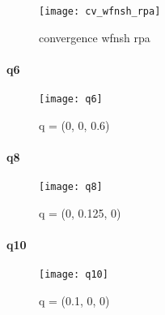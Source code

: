 \begin{figure}[!h]\label{CVwfnshRPA}
    \centering
    \texttt{[image: cv\_wfnsh\_rpa]}
    \caption{convergence wfnsh rpa}
\end{figure}

\paragraph{q6}
\begin{figure}[!h]
    \centering
    \texttt{[image: q6]}
    \caption{q = (0, 0, 0.6)}
\end{figure}


\paragraph{q8}
\begin{figure}[!h]
    \centering
    \texttt{[image: q8]}
    \caption{q = (0, 0.125, 0)}
\end{figure}


\paragraph{q10}
\begin{figure}[!h]
    \centering
    \texttt{[image: q10]}
    \caption{q = (0.1, 0, 0)}
\end{figure}